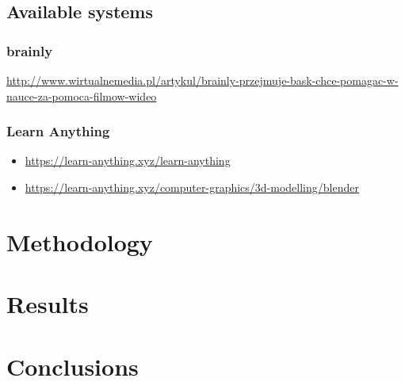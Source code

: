 \documentclass{report}
\begin{document}
\section{Available systems}

\subsection{brainly}

\url{http://www.wirtualnemedia.pl/artykul/brainly-przejmuje-bask-chce-pomagac-w-nauce-za-pomoca-filmow-wideo}

\subsection{Learn Anything}
\begin{itemize}
    \item \url{https://learn-anything.xyz/learn-anything}
    \item \url{https://learn-anything.xyz/computer-graphics/3d-modelling/blender}
\end{itemize}

\chapter{Methodology}
\chapter{Results}
\chapter{Conclusions}



\listoffigures
\listoftables
\end{document}
